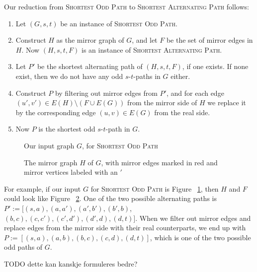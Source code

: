 Our reduction from \textsc{Shortest Odd Path} to \textsc{Shortest Alternating Path} follows:
\begin{enumerate}
    \item Let $(G, s, t)$ be an instance of \textsc{Shortest Odd Path}.
    \item Construct $H$ as the mirror graph of $G$, and let $F$ be the set of mirror edges in $H$. Now $(H, s, t, F)$ is an instance of \textsc{Shortest Alternating Path}.
    \item Let $P'$ be the shortest alternating path of $(H, s, t, F)$, if one exists. If none exist, then we do not have any odd $s$-$t$-paths in $G$ either.
    \item Construct $P$ by filtering out mirror edges from $P'$, and for each edge $(u',v') \in E(H) \setminus (F \cup E(G))$ from the mirror side of $H$ we replace it by the corresponding edge $(u,v) \in E(G)$ from the real side.
    \item Now $P$ is the shortest odd $s$-$t$-path in $G$.
\end{enumerate}

\begin{figure}
    \centering
    
    \caption{Our input graph $G$, for \textsc{Shortest Odd Path}}
    \label{small5}
\end{figure}

\begin{figure}
    \centering
    
    \caption{The mirror graph $H$ of $G$, with mirror edges marked in red and mirror vertices labeled with an $'$}
    \label{small5-2}
\end{figure}

For example, if our input $G$ for \textsc{Shortest Odd Path} is Figure ~\ref{small5}, then $H$ and $F$ could look like Figure ~\ref{small5-2}. One of the two possible alternating paths is $P' := [(s,a), (a, a'), (a',b'), (b',b)$, $(b,c), (c,c'), (c',d'), (d',d), (d,t)]$. When we filter out mirror edges and replace edges from the mirror side with their real counterparts, we end up with $P := [(s,a),(a,b),(b,c),(c,d),(d,t)]$, which is one of the two possible odd paths of $G$. 

TODO dette kan kanskje formuleres bedre?

